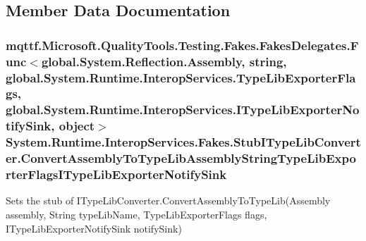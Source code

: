 \subsection{Member Data Documentation}
\hypertarget{class_system_1_1_runtime_1_1_interop_services_1_1_fakes_1_1_stub_i_type_lib_converter_a10eeb1524179a2c7242e942efb9752c2}{
\subsubsection[{Convert\-Assembly\-To\-Type\-Lib\-Assembly\-String\-Type\-Lib\-Exporter\-Flags\-I\-Type\-Lib\-Exporter\-Notify\-Sink}]{\setlength{\rightskip}{0pt plus 5cm}mqttf.\-Microsoft.\-Quality\-Tools.\-Testing.\-Fakes.\-Fakes\-Delegates.\-Func$<$global.\-System.\-Reflection.\-Assembly, string, global.\-System.\-Runtime.\-Interop\-Services.\-Type\-Lib\-Exporter\-Flags, global.\-System.\-Runtime.\-Interop\-Services.\-I\-Type\-Lib\-Exporter\-Notify\-Sink, object$>$ System.\-Runtime.\-Interop\-Services.\-Fakes.\-Stub\-I\-Type\-Lib\-Converter.\-Convert\-Assembly\-To\-Type\-Lib\-Assembly\-String\-Type\-Lib\-Exporter\-Flags\-I\-Type\-Lib\-Exporter\-Notify\-Sink}}\label{class_system_1_1_runtime_1_1_interop_services_1_1_fakes_1_1_stub_i_type_lib_converter_a10eeb1524179a2c7242e942efb9752c2}


Sets the stub of I\-Type\-Lib\-Converter.\-Convert\-Assembly\-To\-Type\-Lib(\-Assembly assembly, String type\-Lib\-Name, Type\-Lib\-Exporter\-Flags flags, I\-Type\-Lib\-Exporter\-Notify\-Sink notify\-Sink)

